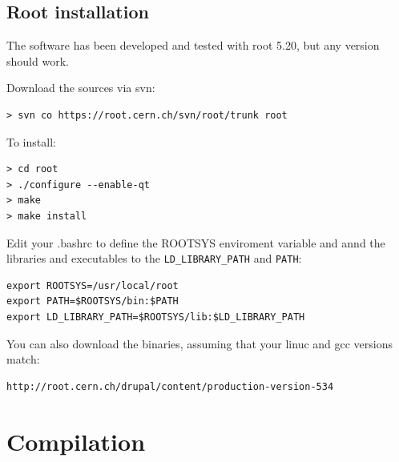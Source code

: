 \documentclass{article}
\begin{document}
\subsection{Root installation}

The software has been developed and tested with root 5.20, but any version should work.

Download the sources via svn:
\begin{verbatim}
> svn co https://root.cern.ch/svn/root/trunk root
\end{verbatim}

To install:
\begin{verbatim}
> cd root
> ./configure --enable-qt
> make
> make install
\end{verbatim}

Edit your .bashrc to define the ROOTSYS enviroment variable and annd the libraries and executables to the \verb=LD_LIBRARY_PATH= and \verb=PATH=:
\begin{verbatim}
export ROOTSYS=/usr/local/root
export PATH=$ROOTSYS/bin:$PATH
export LD_LIBRARY_PATH=$ROOTSYS/lib:$LD_LIBRARY_PATH
\end{verbatim}

You can also download the binaries, assuming that your linuc and gcc versions match:
\begin{verbatim}
http://root.cern.ch/drupal/content/production-version-534
\end{verbatim}


\section{Compilation} 
\end{document}
